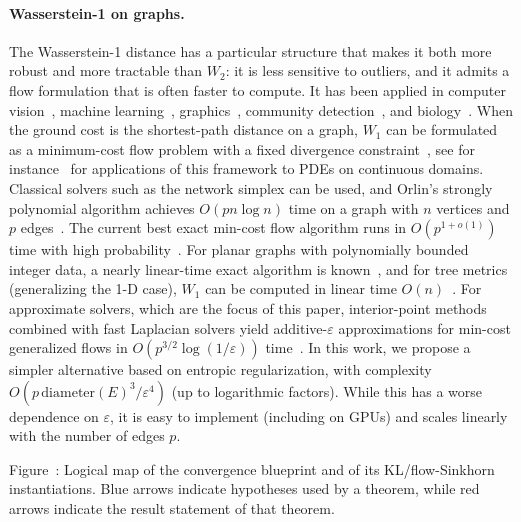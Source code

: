 \documentclass{article}
\theoremstyle{plain}
\newcommand{\Edge}{E}
\begin{document}
\paragraph{Wasserstein-1 on graphs.}  
The Wasserstein-1 distance has a particular structure that makes it both more robust and more tractable than $W_2$: it is less sensitive to outliers, and it admits a flow formulation that is often faster to compute. It has been applied in computer vision~\citep{rubner1998metric,grauman2004fast}, machine learning~\citep{kusner2015word}, graphics~\citep{SolomonEMDSurfaces2014}, community detection~\citep{sia2019ollivier}, and biology~\citep{sandhu2015graph}. When the ground cost is the shortest-path distance on a graph, $W_{1}$ can be formulated as a minimum-cost flow problem with a fixed divergence constraint~\citep{Beckmann52}, see for instance~\citep{carsan10} for applications of this framework to PDEs on continuous domains. Classical solvers such as the network simplex can be used, and Orlin's strongly polynomial algorithm achieves $O(p n\log n)$ time on a graph with $n$ vertices and $p$ edges~\citep{AhujaEtAl93}. The current best exact min-cost flow algorithm runs in $O(p^{1+o(1)})$ time with high probability~\citep{chen2025maximum}. For planar graphs with polynomially bounded integer data, a nearly linear-time exact algorithm is known~\citep{dong2025nested}, and for tree metrics (generalizing the 1-D case), $W_1$ can be computed in linear time $O(n)$~\citep{evans2012phylogenetic}. For approximate solvers, which are the focus of this paper, interior-point methods combined with fast Laplacian solvers yield additive-$\varepsilon$ approximations for min-cost generalized flows in $O(p^{3/2}\log(1/\varepsilon))$ time~\citep{daitch2008faster}. In this work, we propose a simpler alternative based on entropic regularization, with complexity $O(p\,\mathrm{diameter}(\Edge)^3/\varepsilon^{4})$ (up to logarithmic factors). While this has a worse dependence on $\varepsilon$, it is easy to implement (including on GPUs) and scales linearly with the number of edges $p$.


\begin{center}
\label{fig:blueprint}
\resizebox{\linewidth}{!}{}
\smallskip
\parbox{\linewidth}{\small Figure~\thefigure: Logical map of the convergence blueprint and of its KL/flow-Sinkhorn instantiations. Blue arrows indicate hypotheses used by a theorem, while red arrows indicate the result statement of that theorem.}
\end{center}
\end{document}
